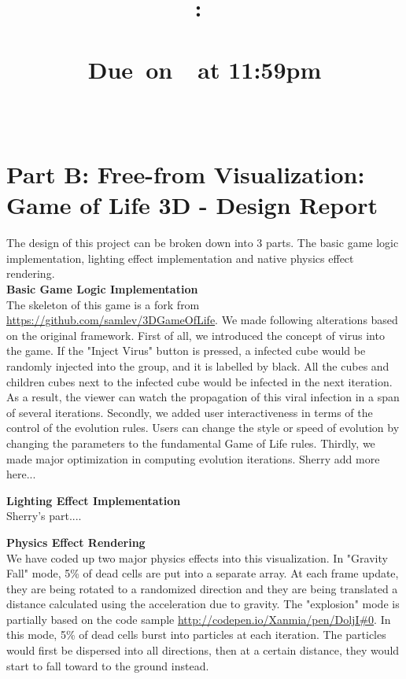 \documentclass{article}
\title{
    \vspace{2in}
    \textmd{\textbf{\hmwkClass:\ \hmwkTitle}}\\
        \textmd{\textbf{\hmwkDetails}}\\
    \normalsize\vspace{0.1in}\small{Due\ on\ \hmwkDueDate\ at 11:59pm}\\
    \vspace{0.1in}\large{\textit{\hmwkClassInstructor}}
    \vspace{3in}
}
\author{
     \textbf{\hmwkAuthorNameA}
     \texttt{\hmwkAuthorStudentNumberA} \\
      \textbf{\hmwkAuthorNameB} 
     \texttt{\hmwkAuthorStudentNumberB}
}
\date{}
\begin{document}
\maketitle

\pagebreak

\section{Part B: Free-from Visualization: Game of Life 3D - Design Report}
The design of this project can be broken down into 3 parts. The basic game logic implementation, lighting effect implementation and native physics effect rendering.\\

\textbf{Basic Game Logic Implementation}\\

The skeleton of this game is a fork from \url{https://github.com/samlev/3DGameOfLife}. We made following alterations based on the original framework. First of all, we introduced the concept of virus into the game. If the "Inject Virus" button is pressed, a infected cube would be randomly injected into the group, and it is labelled by black. All the cubes and children cubes next to the infected cube would be infected in the next iteration. As a result, the viewer can watch the propagation of this viral infection in a span of several iterations. Secondly, we added user interactiveness in terms of the control of the evolution rules. Users can change the style or speed of evolution by changing the parameters to the fundamental Game of Life rules. Thirdly, we made major optimization in computing evolution iterations. Sherry add more here...

\textbf{Lighting Effect Implementation}\\
Sherry's part....

\textbf{Physics Effect Rendering}\\
We have coded up two major physics effects into this visualization. In "Gravity Fall" mode, 5\% of dead cells are put into a separate array. At each frame update, they are being rotated to a randomized direction and they are being translated a distance calculated using the acceleration due to gravity. The "explosion" mode is partially based on the code sample \url{http://codepen.io/Xanmia/pen/DoljI#0}. In this mode, 5\% of dead cells burst into particles at each iteration. The particles would first be dispersed into all directions, then at a certain distance, they would start to fall toward to the ground instead. 
\end{document}
